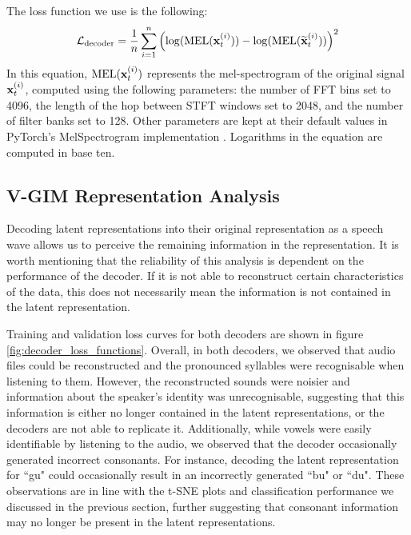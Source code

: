 		The loss function we use is the following:
		$$
		\mathcal{L}_{\text{decoder}} =\frac{1}{n} \sum_{i=1}^n\left( \log (\text{MEL} (\mathbf{x}_t^{(i)})) -\log (\text{MEL} (\widetilde{\mathbf{x}}_t^{(i)} )) \right)^2
		$$
		In this equation, $\text{MEL} (\mathbf{x}_t^{(i)})$ represents the mel-spectrogram of the original signal $\mathbf{x}_t^{(i)}$, computed using the following parameters: the number of FFT bins set to 4096, the length of the hop between STFT windows set to 2048, and the number of filter banks set to 128. Other parameters are kept at their default values in PyTorch's MelSpectrogram implementation \citep{paszkeAutomaticDifferentiationPyTorch2017}. Logarithms in the equation are computed in base ten.
		
		
		
		

			
	\subsection{V-GIM Representation Analysis} \label{cha:bg_repr_analy}
		Decoding latent representations into their original representation as a speech wave allows us to perceive the remaining information in the representation. It is worth mentioning that the reliability of this analysis is dependent on the performance of the decoder. If it is not able to reconstruct certain characteristics of the data, this does not necessarily mean the information is not contained in the latent representation. 
		
		Training and validation loss curves for both decoders are shown in figure \ref{fig:decoder_loss_functions}. Overall, in both decoders, we observed that audio files could be reconstructed and the pronounced syllables were recognisable when listening to them. However, the reconstructed sounds were noisier and information about the speaker's identity was unrecognisable, suggesting that this information is either no longer contained in the latent representations, or the decoders are not able to replicate it. Additionally, while vowels were easily identifiable by listening to the audio, we observed that the decoder occasionally generated incorrect consonants. For instance, decoding the latent representation for ``gu" could occasionally result in an incorrectly generated ``bu" or ``du". These observations are in line with the t-SNE plots and classification performance we discussed in the previous section, further suggesting that consonant information may no longer be present in the latent representations.
		
